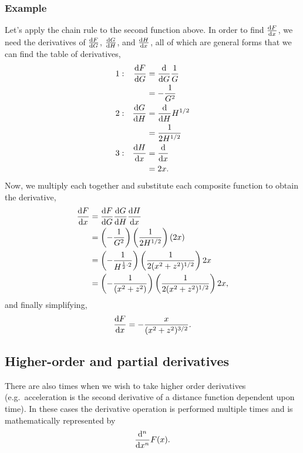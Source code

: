 \subsubsection{Example}
Let's apply the chain rule to the second function above.  In order to find
$\dv{F}{x}$, we need the derivatives of $\dv{F}{G}$, $\dv{G}{H}$, and
$\dv{H}{x}$, all of which are general forms that we can find the table of
derivatives,
\begin{align*}
    1: && \dv{F}{G} &= \dv{}{G} \frac{1}{G} \\
    && &= -\frac{1}{G^2} \\
    2: && \dv{G}{H} &= \dv{}{H} H^{1/2} \\
    && &= \frac{1}{2 H^{1/2}} \\
    3: && \dv{H}{x} &= \dv{}{x} (x^2 + z^2) \\
    && &= 2 x.
\end{align*}
Now, we multiply each together and substitute each composite function to obtain
the derivative,
\begin{align*}
    \dv{F}{x} &= \dv{F}{G} \dv{G}{H} \dv{H}{x} \\
    &= \left(-\frac{1}{G^2}\right) \left(\frac{1}{2 H^{1/2}}\right) (2 x) \\
    &= \left(-\frac{1}{H^{\frac{1}{2} \cdot 2}}\right)
    \left(\frac{1}{2 (x^2 + z^2)^{1/2}}\right) 2 x \\
    &= \left(-\frac{1}{(x^2 + z^2)}\right)
    \left(\frac{1}{2 (x^2 + z^2)^{1/2}}\right) 2x,
\end{align*}
and finally simplifying,
\begin{equation*}
    \dv{F}{x} = - \frac{x}{(x^2 + z^2)^{3/2}} .
\end{equation*}

\subsection{Higher-order and partial derivatives}
There are also times when we wish to take higher order derivatives (e.g.\
acceleration is the second derivative of a distance function dependent upon
time).  In these cases the derivative operation is performed multiple times and
is mathematically represented by
\begin{equation}
    \dv[n]{}{x} F(x).
\end{equation}

